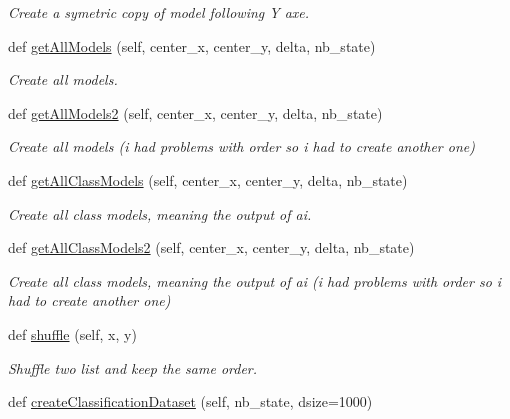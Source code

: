 \begin{DoxyCompactItemize}
\begin{DoxyCompactList}\small\item\em Create a symetric copy of model following Y axe. \end{DoxyCompactList}\item 
def \mbox{\hyperlink{classDatasetManager_1_1DatasetManager_ab9a81926fce61fa42e47ad0471ca9693}{get\+All\+Models}} (self, center\+\_\+x, center\+\_\+y, delta, nb\+\_\+state)
\begin{DoxyCompactList}\small\item\em Create all models. \end{DoxyCompactList}\item 
def \mbox{\hyperlink{classDatasetManager_1_1DatasetManager_ac917cfc70457ce95244406d2b909f36d}{get\+All\+Models2}} (self, center\+\_\+x, center\+\_\+y, delta, nb\+\_\+state)
\begin{DoxyCompactList}\small\item\em Create all models (i had problems with order so i had to create another one) \end{DoxyCompactList}\item 
def \mbox{\hyperlink{classDatasetManager_1_1DatasetManager_a96d1116353ae5dc3841786f424276504}{get\+All\+Class\+Models}} (self, center\+\_\+x, center\+\_\+y, delta, nb\+\_\+state)
\begin{DoxyCompactList}\small\item\em Create all class models, meaning the output of ai. \end{DoxyCompactList}\item 
def \mbox{\hyperlink{classDatasetManager_1_1DatasetManager_a80626776f98a3b4286d269376bb0bc6b}{get\+All\+Class\+Models2}} (self, center\+\_\+x, center\+\_\+y, delta, nb\+\_\+state)
\begin{DoxyCompactList}\small\item\em Create all class models, meaning the output of ai (i had problems with order so i had to create another one) \end{DoxyCompactList}\item 
def \mbox{\hyperlink{classDatasetManager_1_1DatasetManager_a4f0525d718b6196c7dc922957418ab00}{shuffle}} (self, x, y)
\begin{DoxyCompactList}\small\item\em Shuffle two list and keep the same order. \end{DoxyCompactList}\item 
def \mbox{\hyperlink{classDatasetManager_1_1DatasetManager_aacab55c5dd501410186b7cb4eb49d3fc}{create\+Classification\+Dataset}} (self, nb\+\_\+state, dsize=1000)

\end{DoxyCompactItemize}
